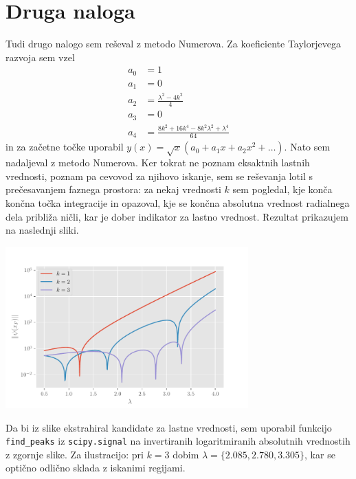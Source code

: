 \documentclass[a4paper,oneside,12pt]{article}
\begin{document}
\section{Druga naloga}

Tudi drugo nalogo sem reševal z metodo Numerova. Za koeficiente Taylorjevega razvoja sem vzel
\begin{align*}
a_0 &= 1\\
a_1 &= 0\\
a_2 &= \frac{\lambda^2 - 4 k^2}{4}\\
a_3 &= 0\\
a_4 &= \frac{8 k^2 + 16 k^4 - 8 k^2 \lambda^2 + \lambda^4}{64}
\end{align*}
in za začetne točke uporabil $y(x) = \sqrt{x} \left(a_0 + a_1 x + a_2 x^2 + \ldots \right)$. Nato sem nadaljeval z metodo Numerova. Ker tokrat ne poznam eksaktnih lastnih vrednosti, poznam pa cevovod za njihovo iskanje, sem se reševanja lotil s prečesavanjem faznega prostora: za nekaj vrednosti $k$ sem pogledal, kje konča končna točka integracije in opazoval, kje se končna absolutna vrednost radialnega dela približa ničli, kar je dober indikator za lastno vrednost. Rezultat prikazujem na naslednji sliki.
\begin{center}
     \includegraphics[width=0.7\textwidth]{../old/2021-2-magnitude.pdf}
\end{center}
Da bi iz slike ekstrahiral kandidate za lastne vrednosti, sem uporabil funkcijo \verb|find_peaks| iz \verb|scipy.signal| na invertiranih logaritmiranih absolutnih vrednostih z zgornje slike. Za ilustracijo: pri $k=3$ dobim $\lambda = \{2.085, 2.780, 3.305\}$, kar se optično odlično sklada z iskanimi regijami.
\end{document}
